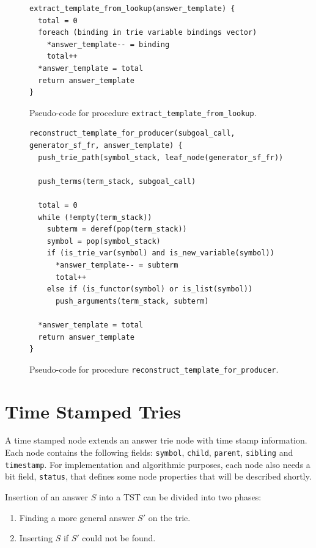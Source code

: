 \begin{figure}[ht]
\begin{Verbatim}
extract_template_from_lookup(answer_template) {
  total = 0
  foreach (binding in trie variable bindings vector)
    *answer_template-- = binding
    total++
  *answer_template = total
  return answer_template
}
\end{Verbatim}
\caption{Pseudo-code for procedure \texttt{extract\_template\_from\_lookup}.}
\label{fig:extract_template_from_lookup}
\end{figure}

\begin{figure}[ht]
\begin{Verbatim}
reconstruct_template_for_producer(subgoal_call, generator_sf_fr, answer_template) {
  push_trie_path(symbol_stack, leaf_node(generator_sf_fr))
  
  push_terms(term_stack, subgoal_call)
  
  total = 0
  while (!empty(term_stack))
    subterm = deref(pop(term_stack))
    symbol = pop(symbol_stack)
    if (is_trie_var(symbol) and is_new_variable(symbol))
      *answer_template-- = subterm
      total++
    else if (is_functor(symbol) or is_list(symbol))
      push_arguments(term_stack, subterm)
  
  *answer_template = total
  return answer_template
}
\end{Verbatim}
\caption{Pseudo-code for procedure \texttt{reconstruct\_template\_for\_producer}.}
\label{fig:reconstruct_template_for_producer}
\end{figure}

\section{Time Stamped Tries}

A time stamped node extends an answer trie node with time stamp information.
Each node contains the following fields: \texttt{symbol}, \texttt{child}, \texttt{parent}, \texttt{sibling}
and \texttt{timestamp}. For implementation and algorithmic purposes, each node also needs a bit field,
\texttt{status}, that defines some node properties that will be described shortly.

Insertion of an answer $S$ into a TST can be divided into two phases:

\begin{enumerate}
  \item Finding a more general answer $S'$ on the trie.
  \item Inserting $S$ if $S'$ could not be found.
\end{enumerate}

